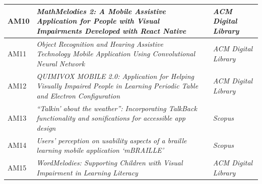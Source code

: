 \begin{quadro}[htb!]
\begin{tabular}{|m{1.2cm} | m{8.0cm} | m{2.6cm} | m{2.5cm}|}
    AM10           & \emph{MathMelodies 2: A Mobile Assistive Application for People with Visual Impairments Developed with React Native}               & \cite{Ducci2018}        & \emph{ACM Digital Library} \\ \hline
    AM11           & \emph{Object Recognition and Hearing Assistive Technology Mobile Application Using Convolutional Neural Network}                   & \cite{Caballero2020}    & \emph{ACM Digital Library} \\ \hline
    AM12           & \emph{QUIMIVOX MOBILE 2.0: Application for Helping Visually Impaired People in Learning Periodic Table and Electron Configuration} & \cite{Oliveira2019}     & \emph{ACM Digital Library} \\ \hline
    AM13           & \emph{``Talkin' about the weather'': Incorporating TalkBack functionality and sonifications for accessible app design}             & \cite{Tomlinson2016377} & \emph{Scopus}              \\ \hline
    AM14           & \emph{Users’ perception on usability aspects of a braille learning mobile application ‘mBRAILLE’}                                  & \cite{Nahar2019100}     & \emph{Scopus}              \\ \hline
    AM15           & \emph{WordMelodies: Supporting Children with Visual Impairment in Learning Literacy}                                               & \cite{Mascetti2019}     & \emph{ACM Digital Library} \\ \hline
  \end{tabular}
\end{quadro}